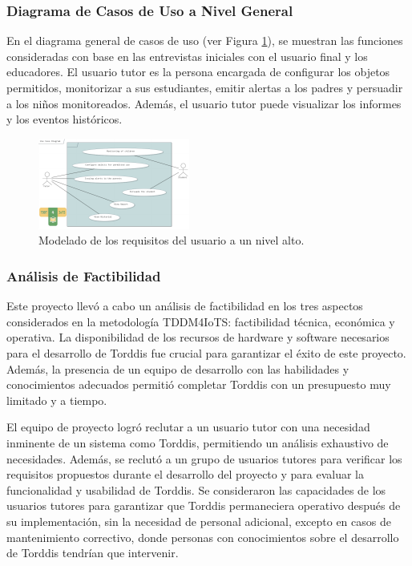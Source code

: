 \documentclass[a4paper,fleqn]{cas-sc}
\begin{document}
	\subsubsection{Diagrama de Casos de Uso a Nivel General}
	En el diagrama general de casos de uso (ver Figura \ref{fig:UseCaseDiagram}), se muestran las funciones consideradas con base en las entrevistas iniciales con el usuario final y los educadores. El usuario tutor es la persona encargada de configurar los objetos permitidos, monitorizar a sus estudiantes, emitir alertas a los padres y persuadir a los niños monitoreados. Además, el usuario tutor puede visualizar los informes y los eventos históricos.
	
	\begin{figure}[hbt!]
		\centering
		\includegraphics[frame,scale=0.5, width=\linewidth]{figs/Figure_4}
		\caption{Modelado de los requisitos del usuario a un nivel alto.\label{fig:UseCaseDiagram}}
	\end{figure} 
	
	\subsubsection{Análisis de Factibilidad}
	Este proyecto llevó a cabo un análisis de factibilidad en los tres aspectos considerados en la metodología TDDM4IoTS: factibilidad técnica, económica y operativa. La disponibilidad de los recursos de hardware y software necesarios para el desarrollo de Torddis fue crucial para garantizar el éxito de este proyecto. Además, la presencia de un equipo de desarrollo con las habilidades y conocimientos adecuados permitió completar Torddis con un presupuesto muy limitado y a tiempo.
	
	El equipo de proyecto logró reclutar a un usuario tutor con una necesidad inminente de un sistema como Torddis, permitiendo un análisis exhaustivo de necesidades. Además, se reclutó a un grupo de usuarios tutores para verificar los requisitos propuestos durante el desarrollo del proyecto y para evaluar la funcionalidad y usabilidad de Torddis. Se consideraron las capacidades de los usuarios tutores para garantizar que Torddis permaneciera operativo después de su implementación, sin la necesidad de personal adicional, excepto en casos de mantenimiento correctivo, donde personas con conocimientos sobre el desarrollo de Torddis tendrían que intervenir.
	
\end{document}
